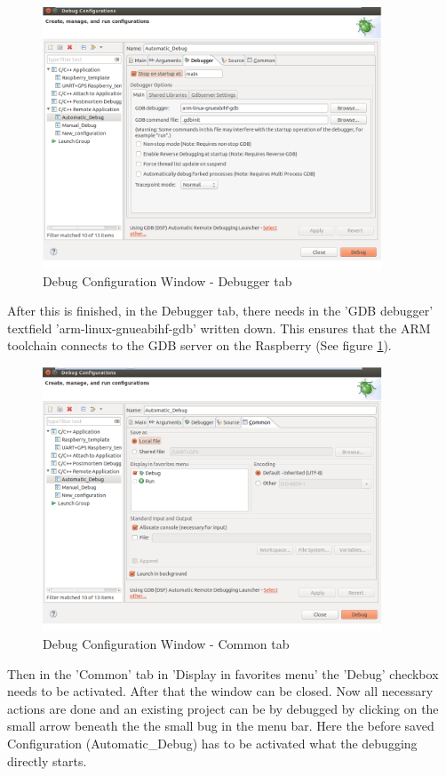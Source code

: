 \begin{figure}[H]
	\centering\includegraphics[width=0.9\textwidth]{fig/Dev_Concept/Debug6}
	\caption{Debug Configuration Window - Debugger tab}
	\label{fig:Debug6}
\end{figure}
After this is finished, in the Debugger tab, there needs in the 'GDB debugger' textfield 'arm-linux-gnueabihf-gdb' written down. This ensures that the ARM toolchain connects to the GDB server on the Raspberry (See figure \ref{fig:Debug6}).

\begin{figure}[H]
	\centering\includegraphics[width=0.9\textwidth]{fig/Dev_Concept/Debug7}
	\caption{Debug Configuration Window - Common tab}
	\label{fig:Debug7}
\end{figure}

Then in the 'Common' tab in 'Display in favorites menu' the 'Debug' checkbox needs to be activated. After that the window can be closed. Now all necessary actions are done and an existing project can be by debugged by clicking on the small arrow beneath the the small bug in the menu bar. Here the before saved Configuration (Automatic\_Debug) has to be activated what the debugging directly starts.

